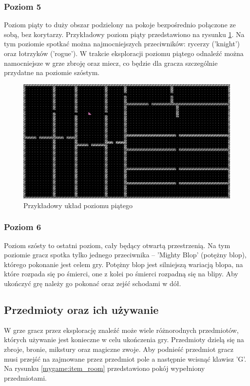 \documentclass[12pt,twoside]{article}
\begin{document}
\subsubsection{Poziom 5}
Poziom piąty to duży obszar podzielony na pokoje bezpośrednio połączone ze sobą, bez korytarzy. Przykładowy poziom piąty przedstawiono na rysunku \ref{mygame:map5}. Na tym poziomie spotkać można najmocniejszych przeciwników: rycerzy ('knight') oraz łotrzyków ('rogue'). W trakcie eksploracji poziomu piątego odnaleźć można namocniejsze w grze zbroję oraz miecz, co będzie dla gracza szczególnie przydatne na poziomie szóstym.

\FloatBarrier
\begin{figure}[h]
	\centering
	\includegraphics[width=12cm]{images/mygame/map5.png}
	\caption{Przykładowy układ poziomu piątego}
	\label{mygame:map5}
\end{figure}
\FloatBarrier


\subsubsection{Poziom 6}
Poziom szósty to ostatni poziom, cały będący otwartą przestrzenią. Na tym poziomie gracz spotka tylko jednego przeciwnika -- 'Mighty Blop' (potężny blop), którego pokonanie jest celem gry. Potężny blop jest silniejszą wariacją blopa, na które rozpada się po śmierci, one z kolei po śmierci rozpadną się na blipy. Aby ukończyć grę należy go pokonać oraz zejść schodami w dół.


\subsection{Przedmioty oraz ich używanie}
W grze gracz przez eksplorację znaleźć może wiele różnorodnych przedmiotów, których używanie jest konieczne w celu ukończenia gry. Przedmioty dzielą się na zbroje, bronie, mikstury oraz magiczne zwoje. Aby podnieść przedmiot gracz musi przejść na zajmowane przez przedmiot pole a następnie wcisnąć klawisz 'G'. Na rysunku \ref{mygame:item_room} przedstawiono pokój wypełniony przedmiotami.
\end{document}
